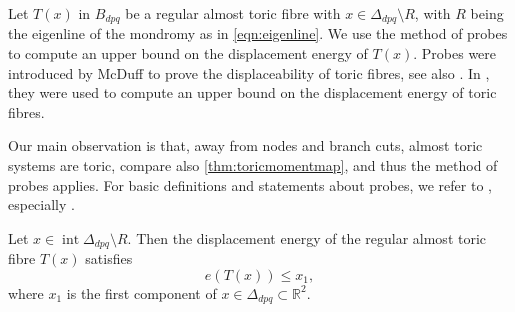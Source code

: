 \documentclass[12pt,a4paper,draft]{scrartcl}
\begin{document}
Let $T(x)$ in $B_{dpq}$ be a regular almost toric fibre with $x \in \Delta_{dpq} \setminus R$, with $R$ being the eigenline of the mondromy as in \eqref{eqn:eigenline}.
We use the method of probes to compute an upper bound on the displacement energy of $T(x)$.
Probes were introduced by McDuff \cite{mcduff2011displacing} to prove the displaceability of toric fibres, see also \cite{AbrBorMcD14}.
In \cite{brendel2020real}, they were used to compute an upper bound on the displacement energy of toric fibres.

Our main observation is that, away from nodes and branch cuts, almost toric systems are toric, compare also \cref{thm:toricmomentmap}, and thus the method of probes applies.
For basic definitions and statements about probes, we refer to \cite{mcduff2011displacing}, especially \cite[Definition 2.3, Lemma 2.4]{mcduff2011displacing}.


\begin{lemma}
    \label{thm:upper_bound}
    Let $x \in \operatorname{int} \Delta_{dpq} \setminus R$.
Then the displacement energy of the regular almost toric fibre $T(x)$ satisfies
    \[ e(T(x))\leq x_1, \]
    where $x_1$ is the first component of $x \in \Delta_{dpq} \subset \mathbb{R}^2$.
\end{lemma}
\end{document}
